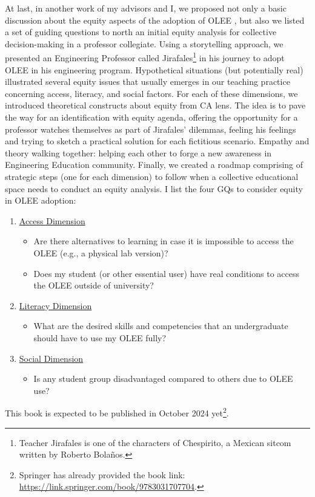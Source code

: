 At last, in another work of my advisors and I, we proposed not only a basic discussion about the equity aspects of the adoption of \gls{OLEE} \cite{bispojr:2024-online-lab}, but also we listed a set of guiding questions to north an initial equity analysis for collective decision-making in a professor collegiate. Using a storytelling approach, we presented an Engineering Professor called Jirafales\footnote{Teacher Jirafales is one of the characters of Chespirito, a Mexican sitcom written by Roberto Bolaños.} in his journey to adopt \gls{OLEE} in his engineering program. Hypothetical situations (but potentially real) illustrated several equity issues that usually emerges in our teaching practice concerning access, literacy, and social factors. For each of these dimensions, we introduced theoretical constructs about equity from \gls{CA} lens. The idea is to pave the way for an identification with equity agenda, offering the opportunity for a professor watches themselves as part of Jirafales' dilemmas, feeling his feelings and trying to sketch a practical solution for each fictitious scenario. Empathy and theory walking together: helping each other to forge a new awareness in Engineering Education community. Finally, we created a roadmap comprising of strategic steps (one for each dimension) to follow when a collective educational space needs to conduct an equity analysis. I list the four \glspl{GQ} to consider equity in \gls{OLEE} adoption:
\begin{enumerate}
    \item \underline{Access Dimension}
    \begin{itemize}
        \item[(\gls{GQ}1)] Are there alternatives to learning in case it is impossible to access the OLEE (e.g., a physical lab version)?
        \item[(\gls{GQ}2)] Does my student (or other essential user) have real conditions to access the OLEE outside of university?
    \end{itemize} 
    \item \underline{Literacy Dimension}
    \begin{itemize}
        \item[(\gls{GQ}3)] What are the desired skills and competencies that an undergraduate should have to use my OLEE fully?
    \end{itemize}
    \item \underline{Social Dimension}
    \begin{itemize}
        \item[(\gls{GQ}4)] Is any student group disadvantaged compared to others due to OLEE use?
    \end{itemize}
\end{enumerate}
This book is expected to be published in October 2024 yet\footnote{Springer has already provided the book link: \url{https://link.springer.com/book/9783031707704}.}. 




